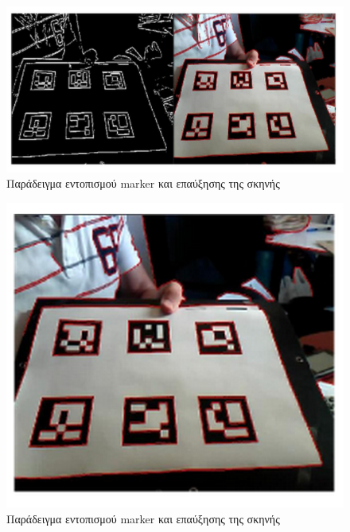 \begin{figure}[H]
    \centering
    \includegraphics[scale=0.6, angle=0]{Files/Figures/aruco1.png}
    \caption[Παράδειγμα εντοπισμού marker και επαύξησης της σκηνής \cite{howmarkerswork}]{ Παράδειγμα εντοπισμού marker και επαύξησης της σκηνής }
    \label{fig:aruco1}
\end{figure}

\begin{figure}[H]
    \centering
    \includegraphics[scale=0.6, angle=0]{Files/Figures/aruco2.png}
    \caption[Παράδειγμα εντοπισμού marker και επαύξησης της σκηνής \cite{howmarkerswork}]{ Παράδειγμα εντοπισμού marker και επαύξησης της σκηνής \cite{howmarkerswork}}
    \label{fig:aruco2}
\end{figure}


